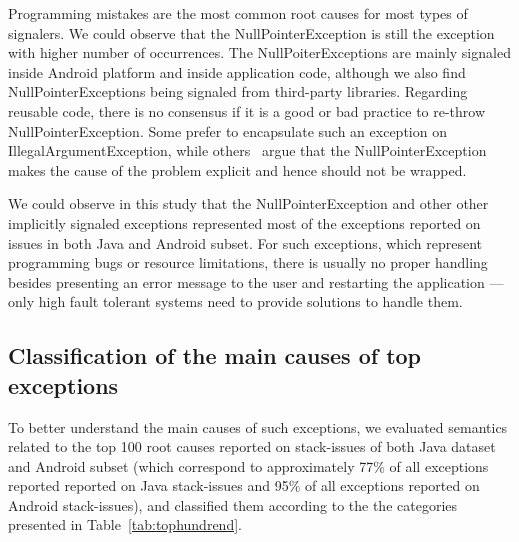 \documentclass[conference]{IEEEtran}
\begin{document}

Programming mistakes are the most common root causes for most types of signalers. We
could observe that the NullPointerException is still the exception with higher
number of occurrences. The NullPoiterExceptions are mainly signaled inside
Android platform and inside application code, although we also find
NullPointerExceptions being signaled from third-party libraries. Regarding
reusable code, there is no consensus if it is a good or bad practice to re-throw
NullPointerException. Some prefer to encapsulate such an exception on
IllegalArgumentException, while others~\cite{bloch2008effective} argue that the
NullPointerException makes the cause of the problem explicit and hence 
should not be wrapped.

We could observe in this study that the NullPointerException and other
other implicitly signaled exceptions represented most of the exceptions reported
on issues in both Java and Android subset. For such exceptions, which represent
programming bugs or resource limitations, there is usually no proper handling
besides presenting an error message to the user and restarting the application ---
only high fault tolerant systems need to provide solutions to handle them.

\subsection{Classification of the main causes of top exceptions}

To better understand the main causes of such exceptions, we evaluated semantics
related to the top 100 root causes reported on stack-issues of both Java dataset
and Android subset (which correspond to approximately 77\% of all exceptions
reported reported on Java stack-issues and 95\% of all exceptions reported on
Android stack-issues), and classified them according to the the categories
presented in Table~\ref{tab:tophundrend}.
\end{document}
